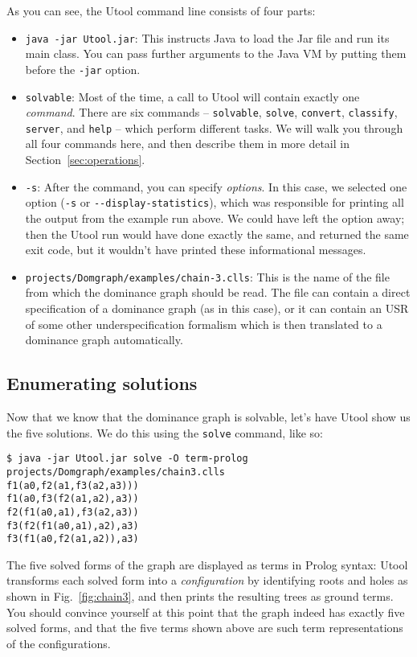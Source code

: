 As you can see, the Utool command line consists of four parts:
\begin{itemize}
\item \verb?java -jar Utool.jar?: This instructs Java to load the Jar
file and run its main class. You can pass further arguments to the
Java VM by putting them before the \verb?-jar? option.
\item \verb?solvable?: Most of the time, a call to Utool will contain
exactly one \emph{command}. There are six commands -- \verb?solvable?,
\verb?solve?, \verb?convert?, \verb?classify?, \verb?server?, and
\verb?help? -- which perform different tasks. We will walk you through
all four commands here, and then describe them in more detail in
Section~\ref{sec:operations}.
\item \verb?-s?: After the command, you can specify \emph{options}. In
this case, we selected one option (\verb?-s? or
\verb?--display-statistics?), which was responsible for printing all
the output from the example run above. We could have left the option
away; then the Utool run would have done exactly the same, and
returned the same exit code, but it wouldn't have printed these
informational messages.
\item \verb?projects/Domgraph/examples/chain-3.clls?: This is the name
of the file from which the dominance graph should be read. The file
can contain a direct specification of a dominance graph (as in this
case), or it can contain an USR of some other underspecification
formalism which is then translated to a dominance graph
automatically.
\end{itemize}



\subsection{Enumerating solutions}

Now that we know that the dominance graph is solvable, let's have
Utool show us the five solutions. We do this using the \verb?solve?
command, like so:

\begin{verbatim}
$ java -jar Utool.jar solve -O term-prolog projects/Domgraph/examples/chain3.clls
f1(a0,f2(a1,f3(a2,a3)))
f1(a0,f3(f2(a1,a2),a3))
f2(f1(a0,a1),f3(a2,a3))
f3(f2(f1(a0,a1),a2),a3)
f3(f1(a0,f2(a1,a2)),a3)
\end{verbatim}

The five solved forms of the graph are displayed as terms in Prolog
syntax: Utool transforms each solved form into a \emph{configuration}
by identifying roots and holes as shown in Fig.~\ref{fig:chain3}, and
then prints the resulting trees as ground terms. You should convince
yourself at this point that the graph indeed has exactly five solved
forms, and that the five terms shown above are such term
representations of the configurations.

